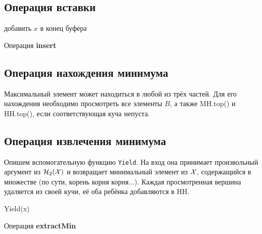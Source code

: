 \subsection{Операция вставки} \label{insert}
\begin{algorithm}[h]
 добавить $x$ в конец буфера\;
 \caption{Операция \textbf{insert}}
 \label{algo-findmin}
\end{algorithm}

\subsection{Операция нахождения минимума}
Максимальный элемент может находиться в любой из трёх частей.
Для его нахождения необходимо просмотреть все элементы $B$, а также
MH.top() и HH.top(), если соответствующая куча
непуста.

\subsection{Операция извлечения минимума} \label{findmin}

Опишем вспомогательную функцию \texttt{Yield}. На вход она принимает
произвольный аргумент из $\mathcal{H}_2(\mathcal{X})$ и возвращает минимальный
элемент из $\mathcal{X}$, содержащийся в множестве (по сути, корень корня корня...).
Каждая просмотренная вершина удаляется из своей кучи, её оба ребёнка
добавляются в HH.


\begin{function}[h]
 \caption{Yield(x)}
\end{function}

\begin{algorithm}[h]
 \caption{Операция \textbf{extractMin}}
\end{algorithm}


